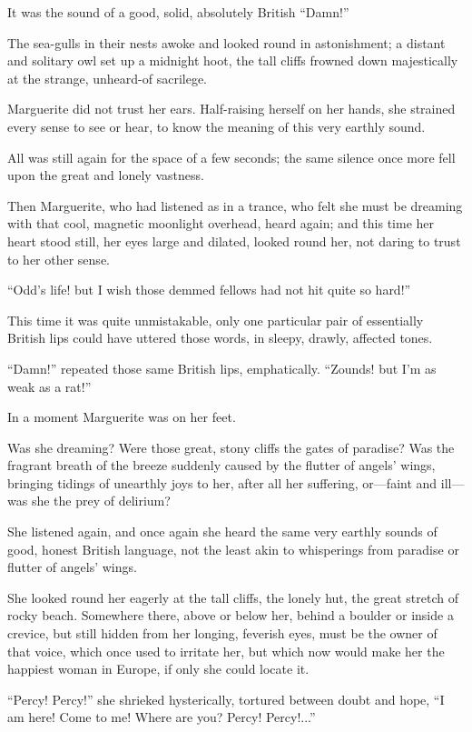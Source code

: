 \documentclass[paper=5.5in:8.5in,BCOR=7mm,twoside,DIV=calc,12pt,usegeometry,chapterprefix,endperiod,headings=big]{scrbook}
\begin{document}
It was the sound of a good, solid, absolutely British \enquote{Damn!}

The sea-gulls in their nests awoke and looked round in astonishment; a distant and solitary owl set up a midnight hoot, the tall cliffs frowned down majestically at the strange, unheard-of sacrilege.

Marguerite did not trust her ears. Half-raising herself on her hands, she strained every sense to see or hear, to know the meaning of this very earthly sound.

All was still again for the space of a few seconds; the same silence once more fell upon the great and lonely vastness.

Then Marguerite, who had listened as in a trance, who felt she must be dreaming with that cool, magnetic moonlight overhead, heard again; and this time her heart stood still, her eyes large and dilated, looked round her, not daring to trust to her other sense.

\enquote{Odd's life! but I wish those demmed fellows had not hit quite so hard!}

This time it was quite unmistakable, only one particular pair of essentially British lips could have uttered those words, in sleepy, drawly, affected tones.

\enquote{Damn!} repeated those same British lips, emphatically. \enquote{Zounds! but I'm as weak as a rat!}

In a moment Marguerite was on her feet.

Was she dreaming? Were those great, stony cliffs the gates of paradise? Was the fragrant breath of the breeze suddenly caused by the flutter of angels’ wings, bringing tidings of unearthly joys to her, after all her suffering, or---faint and ill---was she the prey of delirium?

She listened again, and once again she heard the same very earthly sounds of good, honest British language, not the least akin to whisperings from paradise or flutter of angels’ wings.

She looked round her eagerly at the tall cliffs, the lonely hut, the great stretch of rocky beach. Somewhere there, above or below her, behind a boulder or inside a crevice, but still hidden from her longing, feverish eyes, must be the owner of that voice, which once used to irritate her, but which now would make her the happiest woman in Europe, if only she could locate it.

\enquote{Percy! Percy!} she shrieked hysterically, tortured between doubt and hope, \enquote{I am here! Come to me! Where are you? Percy! Percy!...}
\end{document}
